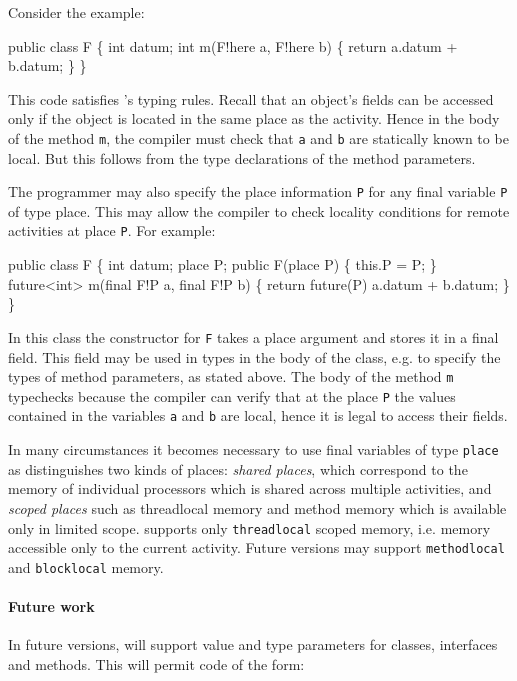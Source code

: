 Consider the example:
\begin{x10}
public class F \{
  int datum;
  int m(F!here a, F!here b) \{
    return a.datum + b.datum;
 \}
\}
\end{x10}
This code satisfies \Xten{}'s typing rules. Recall that 
an object's fields can be accessed only if the object is located in 
the same place as the activity. Hence in the body of the method
{\tt m}, the compiler must check that {\tt a} and {\tt b} are statically
known to be local. But this follows from the type declarations
of the method parameters. 

The programmer may also specify the place information {\tt P} for any
final variable {\tt P} of type place. This may allow the compiler to
check locality conditions for remote activities at place {\tt P}. For
example:
\begin{x10}
public class F \{
  int datum;
  place P;
  public F(place P) \{
    this.P = P;
  \}
  future<int> m(final F!P a, final F!P b) \{
    return future(P) {a.datum + b.datum;}
  \}
\}
\end{x10}
In this class the constructor for {\tt F} takes a place argument and
stores it in a final field. This field may be used in types in the
body of the class, e.g.{} to specify the types of method parameters,
as stated above. The body of the method {\tt m} typechecks because the
compiler can verify that at the place {\tt P} the values contained in
the variables {\tt a} and {\tt b} are local, hence it is legal to 
access their fields. 


In many circumstances it becomes necessary to use final variables of type
{\tt place} as 
\Xten{} distinguishes two kinds of places: {\em shared
places}\label{SharedPlaces}, which correspond to
the memory of individual processors which is shared across multiple
activities, and {\em scoped
places}\label{ScopedPlaces} such as threadlocal
memory and method memory which is available only in limited
scope. \XtenCurrVer{} supports only {\tt threadlocal} scoped memory,
i.e.{} memory accessible only to the current activity.  Future
versions may support {\tt methodlocal} and {\tt blocklocal} memory.

\paragraph{ Future work }

In future versions, \Xten{} will support value and type parameters for
classes, interfaces and methods. This will permit code of the form:

